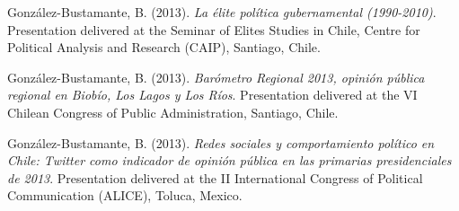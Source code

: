 \begin{publications}
\begin{benumerate}{87}

\item{González-Bustamante, B. (2013). {\itshape La élite política gubernamental (1990-2010)}. Presentation delivered at the Seminar of Elites Studies in Chile, Centre for Political Analysis and Research (CAIP), Santiago, Chile.}\vspace{1mm}


\item{González-Bustamante, B. (2013). {\itshape Barómetro Regional 2013, opinión pública regional en Biobío, Los Lagos y Los Ríos}. Presentation delivered at the VI Chilean Congress of Public Administration, Santiago, Chile.}\vspace{1mm}


\item{González-Bustamante, B. (2013). {\itshape Redes sociales y comportamiento político en Chile: Twitter como indicador de opinión pública en las primarias presidenciales de 2013}. Presentation delivered at the II International Congress of Political Communication (ALICE), Toluca, Mexico.}\vspace{1mm}



\end{benumerate}
\end{publications}
